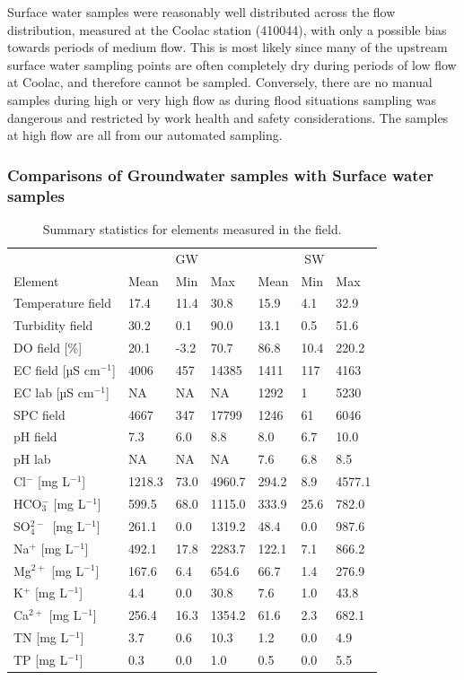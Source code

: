 \documentclass[, manuscript]{copernicus}
\begin{document}
Surface water samples were reasonably well distributed across the flow
distribution, measured at the Coolac station (410044), with only a
possible bias towards periods of medium flow. This is most likely since
many of the upstream surface water sampling points are often completely
dry during periods of low flow at Coolac, and therefore cannot be
sampled. Conversely, there are no manual samples during high or very
high flow as during flood situations sampling was dangerous and
restricted by work health and safety considerations. The samples at high
flow are all from our automated sampling.

\subsubsection{Comparisons of Groundwater samples with Surface water
samples}

\begin{table}
\centering
\caption{\label{tab:TableElementstats}Summary statistics for elements measured in the field.}
\centering
\begin{tabular}[t]{l|l|l|l|l|l|l}
\hline
\multicolumn{1}{c|}{} & \multicolumn{3}{c|}{GW} & \multicolumn{3}{c}{SW} \\
\cline{2-4} \cline{5-7}
Element & Mean & Min & Max & Mean & Min & Max\\
\hline
Temperature field & 17.4 & 11.4 & 30.8 & 15.9 & 4.1 & 32.9\\
\hline
Turbidity field & 30.2 & 0.1 & 90.0 & 13.1 & 0.5 & 51.6\\
\hline
DO field [\%] & 20.1 & -3.2 & 70.7 & 86.8 & 10.4 & 220.2\\
\hline
EC field [µS cm$^{-1}$] & 4006 & 457 & 14385 & 1411 & 117 & 4163\\
\hline
EC lab [µS cm$^{-1}$] & NA & NA & NA & 1292 & 1 & 5230\\
\hline
SPC field & 4667 & 347 & 17799 & 1246 & 61 & 6046\\
\hline
pH field & 7.3 & 6.0 & 8.8 & 8.0 & 6.7 & 10.0\\
\hline
pH lab & NA & NA & NA & 7.6 & 6.8 & 8.5\\
\hline
Cl$^-$ [mg L$^{-1}$] & 1218.3 & 73.0 & 4960.7 & 294.2 & 8.9 & 4577.1\\
\hline
HCO$_3^-$ [mg L$^{-1}$] & 599.5 & 68.0 & 1115.0 & 333.9 & 25.6 & 782.0\\
\hline
SO$_4^{2-}$~[mg L$^{-1}$] & 261.1 & 0.0 & 1319.2 & 48.4 & 0.0 & 987.6\\
\hline
Na$^{+}$ [mg L$^{-1}$] & 492.1 & 17.8 & 2283.7 & 122.1 & 7.1 & 866.2\\
\hline
Mg$^{2+}$ [mg L$^{-1}$] & 167.6 & 6.4 & 654.6 & 66.7 & 1.4 & 276.9\\
\hline
K$^{+}$ [mg L$^{-1}$] & 4.4 & 0.0 & 30.8 & 7.6 & 1.0 & 43.8\\
\hline
Ca$^{2+}$ [mg L$^{-1}$] & 256.4 & 16.3 & 1354.2 & 61.6 & 2.3 & 682.1\\
\hline
TN [mg L$^{-1}$] & 3.7 & 0.6 & 10.3 & 1.2 & 0.0 & 4.9\\
\hline
TP [mg L$^{-1}$] & 0.3 & 0.0 & 1.0 & 0.5 & 0.0 & 5.5\\
\hline
\end{tabular}
\end{table}
\end{document}
